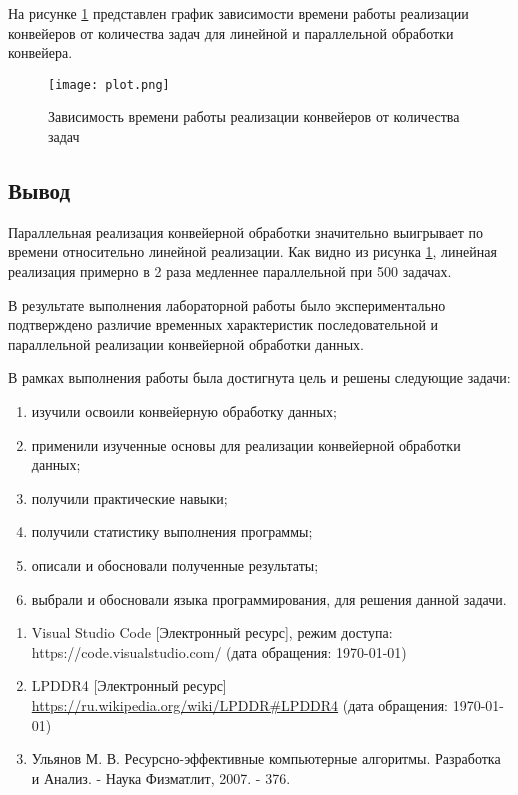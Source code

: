 На рисунке \ref{img:plot} представлен график зависимости времени работы реализации конвейеров от количества задач для линейной и параллельной обработки конвейера.

\begin{figure}[H]
    \centering
    \texttt{[image: plot.png]}
    \caption{Зависимость времени работы реализации конвейеров от количества задач}
    \label{img:plot}
\end{figure}

\subsection{Вывод}

Параллельная реализация конвейерной обработки значительно выигрывает по времени относительно линейной реализации. Как видно из рисунка \ref{img:plot}, линейная реализация примерно в 2 раза медленнее параллельной при 500 задачах.



В результате выполнения лабораторной работы было экспериментально подтверждено различие временных характеристик последовательной и параллельной реализации конвейерной обработки данных.

В рамках выполнения работы была достигнута цель и решены следующие задачи:

\begin{enumerate}
	\item изучили освоили конвейерную обработку данных;
	\item применили изученные основы для реализации конвейерной обработки данных;
	\item получили практические навыки;
	\item получили статистику выполнения программы;
	\item описали и обосновали полученные результаты;
	\item выбрали и обосновали языка программирования, для решения данной задачи.
\end{enumerate}


\begin{enumerate}
	\item Visual Studio Code [Электронный ресурс], режим доступа: https://code.visualstudio.com/ (дата обращения: \today)
	\item LPDDR4 [Электронный ресурс] \url{https://ru.wikipedia.org/wiki/LPDDR#LPDDR4} (дата обращения: \today)
	\item Ульянов М. В. Ресурсно-эффективные компьютерные алгоритмы. Разработка и Анализ. - Наука Физматлит, 2007. - 376.
\end{enumerate}




